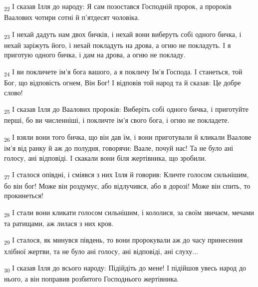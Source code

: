 \begin{tcolorbox}
\textsubscript{22} І сказав Ілля до народу: Я сам позостався Господній пророк, а пророків Ваалових чотири сотні й п'ятдесят чоловіка.
\end{tcolorbox}
\begin{tcolorbox}
\textsubscript{23} І нехай дадуть нам двох бичків, і нехай вони виберуть собі одного бичка, і нехай заріжуть його, і нехай покладуть на дрова, а огню не покладуть. І я приготую одного бичка, і дам на дрова, а огню не покладу.
\end{tcolorbox}
\begin{tcolorbox}
\textsubscript{24} І ви покличете ім'я бога вашого, а я покличу Ім'я Господа. І станеться, той Бог, що відповість огнем, Він Бог! І відповів той народ та й сказав: Це добре слово!
\end{tcolorbox}
\begin{tcolorbox}
\textsubscript{25} І сказав Ілля до Ваалових пророків: Виберіть собі одного бичка, і приготуйте перші, бо ви численніші, і покличте ім'я свого бога, і огню не покладете.
\end{tcolorbox}
\begin{tcolorbox}
\textsubscript{26} І взяли вони того бичка, що він дав їм, і вони приготували й кликали Ваалове ім'я від ранку й аж до полудня, говорячи: Ваале, почуй нас! Та не було ані голосу, ані відповіді. І скакали вони біля жертівника, що зробили.
\end{tcolorbox}
\begin{tcolorbox}
\textsubscript{27} І сталося опівдні, і сміявся з них Ілля й говорив: Кличте голосом сильнішим, бо він бог! Може він роздумує, або відлучився, або в дорозі! Може він спить, то прокинеться!
\end{tcolorbox}
\begin{tcolorbox}
\textsubscript{28} І стали вони кликати голосом сильнішим, і кололися, за своїм звичаєм, мечами та ратищами, аж лилася з них кров.
\end{tcolorbox}
\begin{tcolorbox}
\textsubscript{29} І сталося, як минувся південь, то вони пророкували аж до часу принесення хлібної жертви, та не було ані голосу, ані відповіді, ані слуху...
\end{tcolorbox}
\begin{tcolorbox}
\textsubscript{30} І сказав Ілля до всього народу: Підійдіть до мене! І підійшов увесь народ до нього, а він поправив розбитого Господнього жертівника.
\end{tcolorbox}
